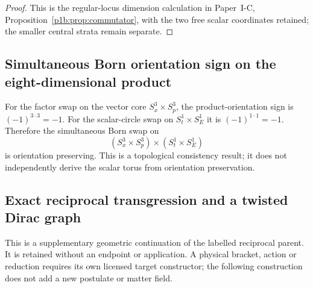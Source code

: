 \documentclass[11pt,a4paper]{article}
\begin{document}
\begin{proof}
This is the regular-locus dimension calculation in Paper~I-C,
Proposition~\ref{p1b:prop:commutator}, with the two free scalar
coordinates retained; the smaller central strata remain separate.
\end{proof}


\subsection{Simultaneous Born orientation sign on the eight-dimensional product}
\label{p3b:app:v191-born-orientation-sign}
For the factor swap on the vector core
$S_x^3\times S_p^3$, the product-orientation sign is
$(-1)^{3\cdot3}=-1$.  For the scalar-circle swap on
$S_t^1\times S_E^1$ it is $(-1)^{1\cdot1}=-1$.  Therefore the simultaneous
Born swap on
\[
 (S_x^3\times S_p^3)\times(S_t^1\times S_E^1)
\]
is orientation preserving.  This is a topological consistency result; it
does not independently derive the scalar torus from orientation preservation.





\subsection{Exact reciprocal transgression and a twisted Dirac graph}
\label{p3b:app:v203-twisted-dirac}
This is a supplementary geometric continuation of the labelled reciprocal
parent. It is retained without an endpoint or application. A physical
bracket, action or reduction requires its own licensed target constructor;
the following construction does not add a new postulate or matter field.
\end{document}
